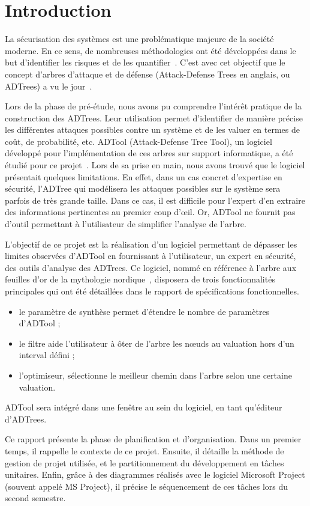 \section{Introduction}
    \label{sec:intro}

    La sécurisation des systèmes est une problématique majeure de la société moderne. En ce sens, de nombreuses méthodologies ont été développées dans le but d'identifier les risques et de les quantifier~\cite{survey}. C'est avec cet objectif que le concept d'arbres d'attaque et de défense (\og Attack-Defense Trees \fg{} en anglais, ou ADTrees) a vu le jour~\cite{JLC}.

    Lors de la phase de pré-étude, nous avons pu comprendre l’intérêt pratique de la construction des ADTrees. Leur utilisation permet d'identifier de manière précise les différentes attaques possibles contre un système et de les valuer en termes de coût, de probabilité, etc. ADTool (Attack-Defense Tree Tool), un logiciel développé pour l'implémentation de ces arbres sur support informatique, a été étudié pour ce projet~\cite{ADTool}. Lors de sa prise en main, nous avons trouvé que le logiciel présentait quelques limitations. En effet, dans un cas concret d'expertise en sécurité, l'ADTree qui modélisera les attaques possibles sur le système sera parfois de très grande taille. Dans ce cas, il est difficile pour l'expert d'en extraire des informations pertinentes au premier coup d’œil. Or, ADTool ne fournit pas d'outil permettant à l'utilisateur de simplifier l'analyse de l'arbre. 

    L'objectif de ce projet est la réalisation d'un logiciel permettant de dépasser les limites observées d'ADTool en fournissant à l'utilisateur, un expert en sécurité, des outils d'analyse des ADTrees. Ce logiciel, nommé \glasir{} en référence à l'arbre aux feuilles d'or de la mythologie nordique~\cite{vikingCulture}, disposera de trois fonctionnalités principales qui ont été détaillées dans le rapport de spécifications fonctionnelles. 
    \begin{itemize}
    	\item le paramètre de synthèse permet d'étendre le nombre de paramètres d'ADTool ;
    	\item le filtre aide l'utilisateur à ôter de l’arbre les nœuds au valuation hors d'un interval défini ;
    	\item l'optimiseur, sélectionne le meilleur chemin dans l'arbre selon une certaine valuation.
    \end{itemize}
    ADTool sera intégré dans une fenêtre au sein du logiciel, en tant qu'éditeur d'ADTrees. 

    Ce rapport présente la phase de planification et d'organisation. Dans un premier temps, il rappelle le contexte de ce projet. Ensuite, il détaille la méthode de gestion de projet utilisée, et le partitionnement du développement en tâches unitaires. Enfin, grâce à des diagrammes réalisés avec le logiciel Microsoft Project (souvent appelé MS Project), il précise le séquencement de ces tâches lors du second semestre.